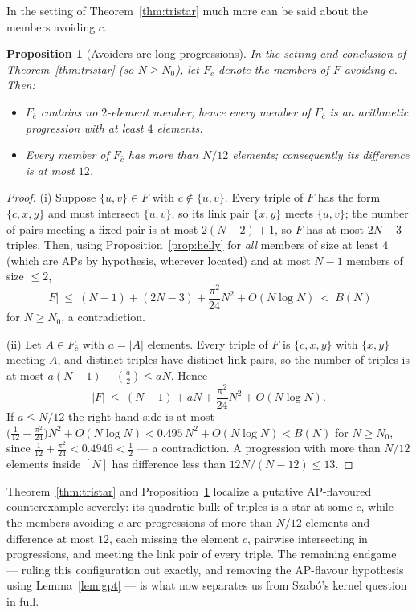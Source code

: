 \documentclass[11pt]{article}
\newtheorem{proposition}[theorem]{Proposition}
\theoremstyle{definition}
\begin{document}
In the setting of Theorem~\ref{thm:tristar} much more can be said about the members avoiding $c$.

\begin{proposition}[Avoiders are long progressions]\label{prop:long}
In the setting and conclusion of Theorem~\ref{thm:tristar} (so $N\ge N_0$), let $F_{\bar c}$ denote the members of $F$ avoiding $c$. Then:
\begin{itemize}
\item[(i)] $F_{\bar c}$ contains no $2$-element member; hence every member of $F_{\bar c}$ is an arithmetic progression with at least $4$ elements.
\item[(ii)] Every member of $F_{\bar c}$ has more than $N/12$ elements; consequently its difference is at most $12$.
\end{itemize}
\end{proposition}

\begin{proof}
(i) Suppose $\{u,v\}\in F$ with $c\notin\{u,v\}$. Every triple of $F$ has the form $\{c,x,y\}$ and must intersect $\{u,v\}$, so its link pair $\{x,y\}$ meets $\{u,v\}$; the number of pairs meeting a fixed pair is at most $2(N-2)+1$, so $F$ has at most $2N-3$ triples. Then, using Proposition~\ref{prop:helly} for \emph{all} members of size at least $4$ (which are APs by hypothesis, wherever located) and at most $N-1$ members of size $\le 2$,
\[ |F|\ \le\ (N-1)+(2N-3)+\frac{\pi^2}{24}N^2+O(N\log N)\ <\ B(N) \]
for $N\ge N_0$, a contradiction.

(ii) Let $A\in F_{\bar c}$ with $a=|A|$ elements. Every triple of $F$ is $\{c,x,y\}$ with $\{x,y\}$ meeting $A$, and distinct triples have distinct link pairs, so the number of triples is at most $a(N-1)-\binom a2\le aN$. Hence
\[ |F|\ \le\ (N-1)+aN+\frac{\pi^2}{24}N^2+O(N\log N). \]
If $a\le N/12$ the right-hand side is at most $\bigl(\tfrac1{12}+\tfrac{\pi^2}{24}\bigr)N^2+O(N\log N)<0.495\,N^2+O(N\log N)<B(N)$ for $N\ge N_0$, since $\tfrac1{12}+\tfrac{\pi^2}{24}<0.4946<\tfrac12$ --- a contradiction. A progression with more than $N/12$ elements inside $[N]$ has difference less than $12N/(N-12)\le 13$.
\end{proof}

Theorem~\ref{thm:tristar} and Proposition~\ref{prop:long} localize a putative AP-flavoured counterexample severely: its quadratic bulk of triples is a star at some $c$, while the members avoiding $c$ are progressions of more than $N/12$ elements and difference at most $12$, each missing the element $c$, pairwise intersecting in progressions, and meeting the link pair of every triple. The remaining endgame --- ruling this configuration out exactly, and removing the AP-flavour hypothesis using Lemma~\ref{lem:gpt} --- is what now separates us from Szab\'o's kernel question in full.
\end{document}

